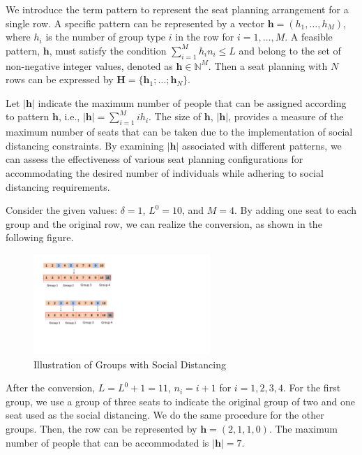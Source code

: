 We introduce the term pattern to represent the seat planning arrangement for a single row. A specific pattern can be represented by a vector $\bm{h} = (h_1, \ldots, h_M)$, where $h_i$ is the number of group type $i$ in the row for $i = 1,\ldots, M$. A feasible pattern, $\bm{h}$, must satisfy the condition $\sum_{i=1}^{M} h_i n_i \leq L$ and belong to the set of non-negative integer values, denoted as $\bm{h} \in \mathbb{N}^{M}$. Then a seat planning with $N$ rows can be expressed by $\bm{H} = \{\bm{h}_1; \ldots; \bm{h}_N\}$.
  
Let $|\bm{h}|$ indicate the maximum number of people that can be assigned according to pattern $\bm{h}$, i.e., $|\bm{h}| = \sum_{i =1}^{M} i h_i$. The size of $\bm{h}$, $|\bm{h}|$, provides a measure of the maximum number of seats that can be taken due to the implementation of social distancing constraints. By examining $|\bm{h}|$ associated with different patterns, we can assess the effectiveness of various seat planning configurations for accommodating the desired number of individuals while adhering to social distancing requirements.

\begin{example}
Consider the given values: $\delta = 1$, $L^{0} = 10$, and $M = 4$. By adding one seat to each group and the original row, we can realize the conversion, as shown in the following figure.

\begin{figure}[ht]
    \centering
        \includegraphics[width=0.6\textwidth]{./Figures/illustration.pdf}
    \caption{Illustration of Groups with Social Distancing}
\end{figure}

After the conversion, $L = L^{0} + 1 =11$, $n_i = i + 1$ for $i = 1, 2, 3, 4$. For the first group, we use a group of three seats to indicate the original group of two and one seat used as the social distancing. We do the same procedure for the other groups. Then, the row can be represented by $\bm{h} = (2,1,1,0)$. The maximum number of people that can be accommodated is $|\bm{h}| = 7$.
\end{example}


